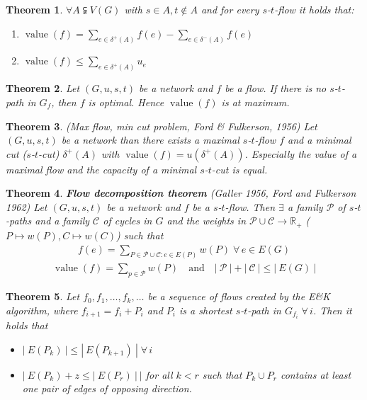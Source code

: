 \documentclass{article}
\newtheorem{theorem}{Theorem}
\newcommand{\card}[1]{\left|\:\!#1\:\!\right|}
\newcommand{\gath}[2]{$#1$-$#2$-path} %
\newcommand{\flow}[2]{$#1$-$#2$-flow}
\newcommand{\fall}{\;\forall\,}
\begin{document}
\begin{theorem}
  \label{lemma-4.2}
  $\forall A \subsetneqq V(G)$ with $s \in A, t \notin A$ and for every $s$-$t$-flow it holds that:
  \begin{enumerate}
    \item $\operatorname{value}{(f)} = \sum_{e \in \delta^+(A)} f(e) - \sum_{e \in \delta^-(A)} f(e)$
    \item $\operatorname{value}{(f)} \leq \sum_{e \in \delta^+(A)} u_e$
  \end{enumerate}
\end{theorem}
\begin{theorem}\label{lemma-4.3}
  Let $(G, u, s, t)$ be a network and $f$ be a flow. If there is no \gath st in $G_f$,
  then $f$ is optimal. Hence $\operatorname{value}(f)$ is at maximum.
\end{theorem}
\begin{theorem} \label{satz-4.4}
  (\emph{Max flow, min cut problem}, Ford \& Fulkerson, 1956)
  Let $(G, u, s, t)$ be a network than there exists a maximal \flow st $f$
  and a minimal cut ($s$-$t$-cut) $\delta^+(A)$ with $\operatorname{value}(f) = u(\delta^+(A))$.
  Especially the value of a maximal flow and the capacity of a minimal $s$-$t$-cut is equal.
\end{theorem}
\begin{theorem}\label{satz-4.5}
  \textbf{Flow decomposition theorem} (Galler 1956, Ford and Fulkerson 1962)
  Let $(G, u, s, t)$ be a network and $f$ be a \flow st. Then $\exists$ a family
  $\mathcal{P}$ of \gath sts and a family $\mathcal{C}$ of cycles in $G$ and the
  weights in $\mathcal{P} \cup \mathcal{C} \rightarrow \mathbb{R}_+$
  ($P \mapsto w(P), C \mapsto w(C)$) such that
  \begin{align*}
    f(e) = \sum_{P \in \mathcal{P} \cup \mathcal{C}: e \in E(P)} w(P) \fall e \in E(G)
  \end{align*}
  \begin{align*}
    \operatorname{value}(f) = \sum_{p \in \mathcal{P}} w(P)
      \quad\text{and}\quad
      \card{\mathcal{P}} + \card{\mathcal{C}} \leq \card{E(G)}
  \end{align*}
\end{theorem}
\begin{theorem}\label{lemma-4.6}
  Let $f_0, f_1, \ldots, f_k, \ldots$ be a sequence of flows created by the E\&K algorithm, where $f_{i+1} = f_i + P_i$ and $P_i$ is a shortest \gath st in $G_{f_i} \fall i$. Then it holds that
  \begin{itemize}
    \item $\card{E(P_k)} \leq \card{E(P_{k+1})} \fall i$
    \item $\card{E(P_k) + z \leq \card{E(P_r)}}$ for all $k < r$ such that $P_k \cup P_r$ contains at least one pair of edges of opposing direction.
  \end{itemize}
\end{theorem}
\end{document}
